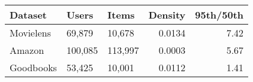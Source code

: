 \begin{tabularx}{\columnwidth}{lllrr}
\toprule
 Dataset       & Users   & Items   &   Density &   95th/50th \\
\midrule
 Movielens & 69,879  & 10,678  &    0.0134 &      7.42 \\
 Amazon        & 100,085 & 113,997 &    0.0003 &      5.67 \\
 Goodbooks     & 53,425  & 10,001  &    0.0112 &      1.41 \\
\bottomrule
\end{tabularx}
